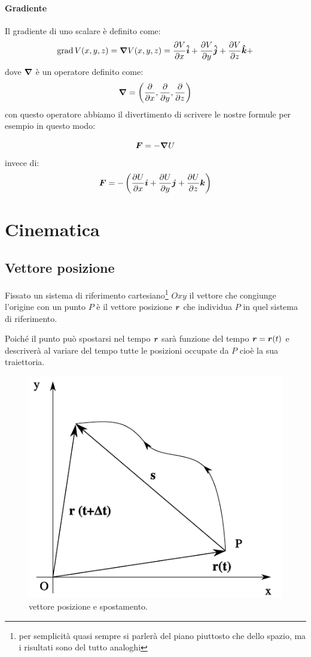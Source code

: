 \subsubsection{Gradiente}
\label{gradiente}
Il gradiente di uno scalare è definito come:
\[
  \operatorname{grad} V(x,y,z)=\boldsymbol{\nabla} V(x,y,z)=\frac{\partial V}{\partial x}\boldsymbol{\hat {i}} + \frac{\partial V}{\partial y}\boldsymbol{\hat {j}} +\frac{\partial V}{\partial z}\boldsymbol{\hat {k}} +
\]
dove $\boldsymbol{\nabla}$ è un operatore definito come:
\[
  \boldsymbol{\nabla}=\left(\frac{\partial}{\partial x},\frac{\partial}{\partial y},\frac{\partial }{\partial z}\right)
\]
con questo operatore abbiamo il divertimento di scrivere le nostre formule per esempio in questo modo:

\[
  \boldsymbol{F}=-\boldsymbol{\nabla} U
\]
invece di:
\[
  \boldsymbol{F}=-\left(\frac{\partial U}{\partial
    x}\boldsymbol{i}+\frac{\partial U}{\partial y}\boldsymbol{j}+\frac{\partial
    U}{\partial z}\boldsymbol{k}\right)
\]

\chapter{Cinematica}
\minitoc
\section{Vettore posizione}
\begin{Def}
  Fissato un sistema di riferimento cartesiano\footnote{per semplicità quasi sempre si parlerà del piano piuttosto che dello spazio, ma i risultati sono del tutto analoghi} $Oxy$ il vettore che congiunge l'origine con un punto $P$ è il vettore posizione $\boldsymbol{r}$ che individua $P$ in quel sistema di riferimento.
\end{Def}
Poiché il punto può spostarsi nel tempo $\boldsymbol{r}$ sarà funzione del tempo $\boldsymbol{r}=\boldsymbol{r}(t)$ e descriverà al variare del tempo tutte le posizioni occupate da $P$ cioè la sua traiettoria.

\begin{figure}[htbp]
  \centering
  \includegraphics[scale=0.7]{immagini/fisica1/vettore_posizione}
  \caption{vettore posizione e spostamento.}
\end{figure}
